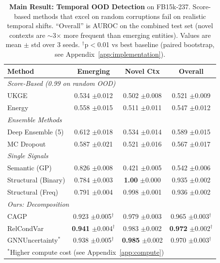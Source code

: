\begin{table}[t]
\centering
\caption{\textbf{Main Result: Temporal OOD Detection} on FB15k-237. Score-based methods that excel on random corruptions fail on realistic temporal shifts. ``Overall'' is AUROC on the combined test set (novel contexts are $\sim$3$\times$ more frequent than emerging entities). Values are mean $\pm$ std over 3 seeds. $^\dagger$p$<$0.01 vs best baseline (paired bootstrap, see Appendix~\ref{app:implementation}).}
\label{tab:temporal}
\vspace{0.5em}
\small
\begin{tabular}{lccc}
\toprule
Method & Emerging & Novel Ctx & Overall \\
\midrule
\multicolumn{4}{l}{\textit{Score-Based (0.99 on random OOD)}} \\
UKGE & 0.534 \tiny{$\pm$0.012} & 0.502 \tiny{$\pm$0.008} & 0.521 \tiny{$\pm$0.009} \\
Energy & 0.558 \tiny{$\pm$0.015} & 0.511 \tiny{$\pm$0.011} & 0.547 \tiny{$\pm$0.012} \\
\midrule
\multicolumn{4}{l}{\textit{Ensemble Methods}} \\
Deep Ensemble (5) & 0.612 \tiny{$\pm$0.018} & 0.534 \tiny{$\pm$0.014} & 0.589 \tiny{$\pm$0.015} \\
MC Dropout & 0.587 \tiny{$\pm$0.021} & 0.521 \tiny{$\pm$0.016} & 0.567 \tiny{$\pm$0.017} \\
\midrule
\multicolumn{4}{l}{\textit{Single Signals}} \\
Semantic (GP) & 0.826 \tiny{$\pm$0.008} & 0.421 \tiny{$\pm$0.005} & 0.542 \tiny{$\pm$0.006} \\
Structural (Binary) & 0.784 \tiny{$\pm$0.003} & \textbf{1.00} \tiny{$\pm$0.000} & 0.935 \tiny{$\pm$0.002} \\
Structural (Freq) & 0.791 \tiny{$\pm$0.004} & 0.998 \tiny{$\pm$0.001} & 0.936 \tiny{$\pm$0.002} \\
\midrule
\multicolumn{4}{l}{\textit{Ours: Decomposition}} \\
CAGP & 0.923 \tiny{$\pm$0.005}$^\dagger$ & 0.979 \tiny{$\pm$0.003} & 0.965 \tiny{$\pm$0.003}$^\dagger$ \\
RelCondVar & \textbf{0.941} \tiny{$\pm$0.004}$^\dagger$ & 0.983 \tiny{$\pm$0.002} & \textbf{0.972} \tiny{$\pm$0.002}$^\dagger$ \\
GNNUncertainty$^*$ & 0.938 \tiny{$\pm$0.005}$^\dagger$ & \textbf{0.985} \tiny{$\pm$0.002} & 0.970 \tiny{$\pm$0.003}$^\dagger$ \\
\bottomrule
\multicolumn{4}{l}{\footnotesize $^*$Higher compute cost (see Appendix~\ref{app:compute})}
\end{tabular}
\end{table}

